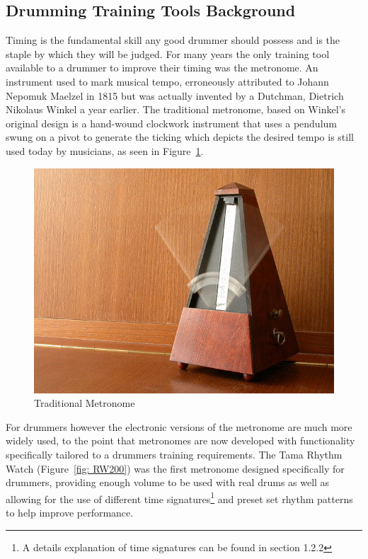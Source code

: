 \documentclass[a4paper, 11pt]{article}
\begin{document}
\subsection{Drumming Training Tools Background}
Timing is the fundamental skill any good drummer should possess and is the staple by which they will be judged. For many years the only training tool available to a drummer to improve their timing was the metronome. An instrument used to mark musical tempo, erroneously attributed to Johann Nepomuk Maelzel in 1815 but was actually invented by a Dutchman, Dietrich Nikolaus Winkel a year earlier. The traditional metronome, based on Winkel's original design is a hand-wound clockwork instrument that uses a pendulum swung on a pivot to generate the ticking which depicts the desired tempo \cite{brit-metro} is still used today by musicians, as seen in Figure~\ref{fig: TradMet}. \par

\begin{figure}[ht]
	\centering
	\includegraphics[scale=0.25]{TradMet}
	\caption{Traditional Metronome}%
	\label{fig: TradMet}
\end{figure}

For drummers however the electronic versions of the metronome are much more widely used, to the point that metronomes are now developed with functionality specifically tailored to a drummers training requirements. The Tama Rhythm Watch (Figure~\ref{fig: RW200}) was the first metronome designed specifically for drummers, providing enough volume to be used with real drums as well as allowing for the use of different time signatures\footnote{A details explanation of time signatures can be found in section 1.2.2} and preset set rhythm patterns to help improve performance.\par
\end{document}
